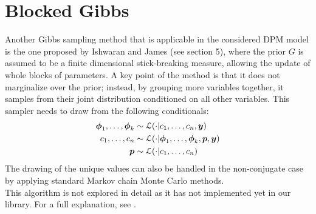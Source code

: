 \section{Blocked Gibbs}
Another Gibbs sampling method that is applicable in the considered DPM model is the one proposed by Ishwaran and James (see \cite{james} section 5), where the prior $G$ is assumed to be a finite dimensional stick-breaking measure, allowing the update of whole blocks of parameters.
A key point of the method is that it does not marginalize over the prior; instead, by grouping more variables together, it samples from their joint distribution conditioned on all other variables.
This sampler needs to draw from the following conditionals:
\begin{align}
	\boldsymbol\phi_1,\dots,\boldsymbol\phi_k &\sim \mathcal L(\cdot | c_1,\dots,c_n, \boldsymbol{y}) \nonumber \\
	c_1,\dots,c_n &\sim \mathcal L (\cdot | \boldsymbol\phi_1,\dots,\boldsymbol\phi_k,\boldsymbol{p}, \boldsymbol{y}) \nonumber \\
	\boldsymbol{p} &\sim \mathcal L (\cdot | c_1,\dots,c_n) \nonumber
\end{align}
The drawing of the unique values can also be handled in the non-conjugate case by applying standard Markov chain Monte Carlo methods. \\
This algorithm is not explored in detail as it has not implemented yet in our library.
For a full explanation, see \cite{james}.
